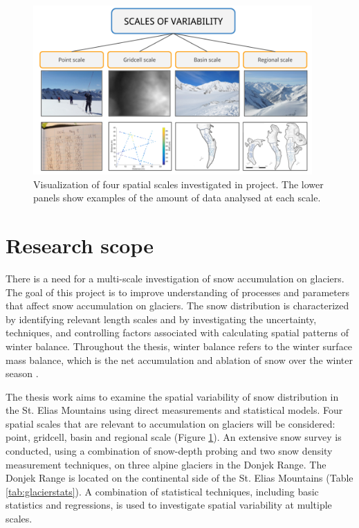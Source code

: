 \documentclass{sfuthesis}
\begin{document}
  \begin{figure}
           \includegraphics[width = 0.95\textwidth]{ScalesOfVariability.png}
       \caption{Visualization of four spatial scales investigated in project. The lower panels show examples of the amount of data analysed at each scale.}
       \label{fig:flowchart_scales}
\end{figure}

\section{Research scope}

There is a need for a multi-scale investigation of snow accumulation on glaciers. The goal of this project is to improve understanding of processes and parameters that affect snow accumulation on glaciers. The snow distribution is characterized by identifying relevant length scales and by investigating the uncertainty, techniques, and controlling factors associated with calculating spatial patterns of winter balance. Throughout the thesis, winter balance refers to the winter surface mass balance, which is the net accumulation and ablation of snow over the winter season \citep{Cogley2011}.

The thesis work aims to examine the spatial variability of snow distribution in the St. Elias Mountains using direct measurements and statistical models. Four spatial scales that are relevant to accumulation on glaciers will be considered: point, gridcell, basin and regional scale (Figure \ref{fig:flowchart_scales}). An extensive snow survey is conducted, using a combination of snow-depth probing and two snow density measurement techniques, on three alpine glaciers in the Donjek Range. The Donjek Range is located on the continental side of the St. Elias Mountains (Table \ref{tab:glacierstats}). A combination of statistical techniques, including basic statistics and regressions, is used to investigate spatial variability at multiple scales. 
\end{document}
